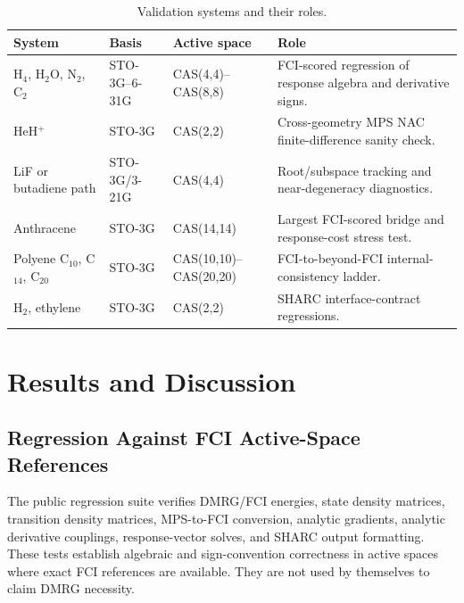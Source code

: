 \documentclass[journal=jctcce,manuscript=article]{achemso}
\begin{document}
\begin{table}[t]
\centering
\scriptsize
\caption{Validation systems and their roles.}
\label{tab:systems}
\begin{tabular}{P{0.19\textwidth}P{0.18\textwidth}P{0.20\textwidth}P{0.34\textwidth}}
\toprule
System & Basis & Active space & Role \\
\midrule
H$_4$, H$_2$O, N$_2$, C$_2$ & STO-3G--6-31G & CAS(4,4)--CAS(8,8) & FCI-scored regression of response algebra and derivative signs. \\
HeH$^+$ & STO-3G & CAS(2,2) & Cross-geometry MPS NAC finite-difference sanity check. \\
LiF or butadiene path & STO-3G/3-21G & CAS(4,4) & Root/subspace tracking and near-degeneracy diagnostics. \\
Anthracene & STO-3G & CAS(14,14) & Largest FCI-scored bridge and response-cost stress test. \\
Polyene C$_{10}$, C$_{14}$, C$_{20}$ & STO-3G & CAS(10,10)--CAS(20,20) & FCI-to-beyond-FCI internal-consistency ladder. \\
H$_2$, ethylene & STO-3G & CAS(2,2) & SHARC interface-contract regressions. \\
\bottomrule
\end{tabular}
\end{table}

\section{Results and Discussion}
\subsection{Regression Against FCI Active-Space References}
The public regression suite verifies DMRG/FCI energies, state density matrices, transition density matrices, MPS-to-FCI conversion, analytic gradients, analytic derivative couplings, response-vector solves, and SHARC output formatting.
These tests establish algebraic and sign-convention correctness in active spaces where exact FCI references are available.
They are not used by themselves to claim DMRG necessity.
\end{document}
